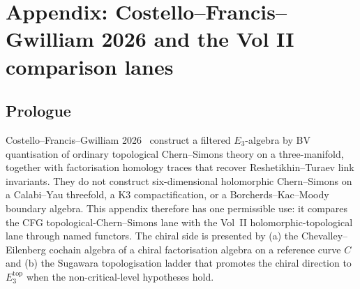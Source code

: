 \chapter{Appendix: Costello--Francis--Gwilliam 2026 and the Vol II
comparison lanes}
\label{app:cfg-side-by-side}

\providecommand{\SCchtop}{\mathsf{SC}^{\mathrm{ch},\mathrm{top}}}
\providecommand{\hCS}{\mathrm{hCS}}
\providecommand{\Obs}{\mathsf{Obs}}
\providecommand{\Fobs}{\mathbf{Obs}}
\providecommand{\cA}{\mathcal{A}}
\providecommand{\cB}{\mathcal{B}}
\providecommand{\cE}{\mathcal{E}}
\providecommand{\cF}{\mathcal{F}}
\providecommand{\cL}{\mathcal{L}}
\providecommand{\cO}{\mathcal{O}}
\providecommand{\cV}{\mathcal{V}}
\providecommand{\fg}{\mathfrak{g}}
\providecommand{\fh}{\mathfrak{h}}
\providecommand{\dbar}{\bar\partial}
\providecommand{\CE}{\mathrm{CE}}
\providecommand{\MC}{\mathrm{MC}}
\providecommand{\Sym}{\mathrm{Sym}}
\providecommand{\Ran}{\mathrm{Ran}}
\providecommand{\Conf}{\mathrm{Conf}}
\providecommand{\FM}{\mathrm{FM}}
\providecommand{\Fact}{\mathrm{Fact}}
\providecommand{\End}{\mathrm{End}}
\providecommand{\Lie}{\mathsf{Lie}}
\providecommand{\Ass}{\mathsf{Ass}}
\providecommand{\BV}{\mathrm{BV}}
\providecommand{\BRST}{\mathrm{BRST}}
\providecommand{\KT}{\mathrm{KT}}
\providecommand{\Tr}{\mathrm{Tr}}
\providecommand{\Omegabar}{\Omega^{0,\bullet}}
\providecommand{\QME}{\mathrm{QME}}
\providecommand{\Disk}{\mathrm{Disk}}
\providecommand{\PhiFA}{\Phi^{\mathrm{FA}}}
\providecommand{\SpCh}{\mathrm{Sp}^{\mathrm{ch}}}
\providecommand{\HolFA}{\mathrm{HolFA}}
\providecommand{\EdHolFA}{E_d\text{-}\HolFA}
\providecommand{\EnHolFA}{E_n\text{-}\HolFA}
\providecommand{\intSigma}{\int_{\Sigma}}

\section*{Prologue}

Costello--Francis--Gwilliam 2026~\cite{CFG2026} construct a filtered
$E_3$-algebra by BV quantisation of ordinary topological
Chern--Simons theory on a three-manifold, together with factorisation
homology traces that recover Reshetikhin--Turaev link invariants. They
do not construct six-dimensional holomorphic Chern--Simons on a
Calabi--Yau threefold, a K3 compactification, or a Borcherds--Kac--Moody
boundary algebra. This appendix therefore has one permissible use: it
compares the CFG topological-Chern--Simons lane with the Vol~II
holomorphic-topological lane through named functors. The chiral side is
presented by (a) the Chevalley--Eilenberg cochain algebra of a chiral
factorisation algebra on a reference curve $C$ and (b) the Sugawara
topologisation ladder that promotes the chiral direction to
$E_3^{\mathrm{top}}$ when the non-critical-level hypotheses hold.


